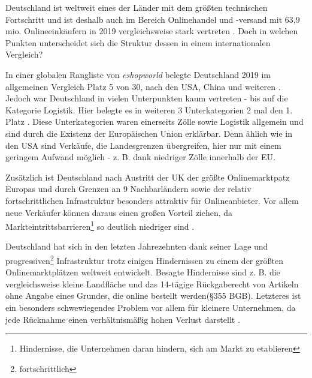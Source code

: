\iffalse

    https://www.worldretailcongress.com/__media/Global_ecommerce_Market_Ranking_2019_001.pdf
    
     \cite{esworld} 

    name: globaler vergleich bezüglich des onlinehandels

\fi

Deutschland ist weltweit eines der Länder mit dem größten technischen Fortschritt und ist deshalb auch im Bereich Onlinehandel und -versand mit 63,9 mio. Onlineeinkäufern in 2019 vergleichsweise stark vertreten \cite[S. 8]{esworld}. Doch in welchen Punkten unterscheidet sich die Struktur dessen in einem internationalen Vergleich?

In einer globalen Rangliste von \emph{eshopworld} belegte Deutschland 2019 im allgemeinen Vergleich Platz 5 von 30, nach den USA, China und weiteren \cite[S. 3]{esworld}. Jedoch war Deutschland in vielen Unterpunkten kaum vertreten - bis auf die Kategorie Logistik. Hier belegte es in weiteren 3 Unterkategorien 2 mal den 1. Platz \cite[S. 10ff]{esworld}. Diese Unterkategorien waren einerseits Zölle sowie Logistik allgemein und sind durch die Existenz der Europäischen Union erklärbar. Denn ählich wie in den USA \cite[S. 4]{esworld} sind Verkäufe, die Landesgrenzen übergreifen, hier nur mit einem geringem Aufwand möglich - z. B. dank niedriger Zölle innerhalb der EU.%

Zusätzlich ist Deutschland nach Austritt der UK der größte Onlinemarktpatz Europas und durch Grenzen an 9 Nachbarländern sowie der relativ fortschrittlichen Infrastruktur besonders attraktiv für Onlineanbieter. Vor allem neue Verkäufer können daraus einen großen Vorteil ziehen, da Markteintrittsbarrieren\footnote{Hindernisse, die Unternehmen daran hindern, sich am Markt zu etablieren} so deutlich niedriger sind \cite[S. 8]{esworld}.

Deutschland hat sich in den letzten Jahrezehnten dank seiner Lage und progressiven\footnote{fortschrittlich} Infrastruktur trotz einigen Hindernissen zu einem der größten Onlinemarktplätzen weltweit entwickelt. Besagte Hindernisse sind z. B. die vergleichsweise kleine Landfläche und das 14-tägige Rückgaberecht von Artikeln ohne Angabe eines Grundes, die online bestellt werden(§355 BGB). Letzteres ist ein besonders schwewiegendes Problem vor allem für kleinere Unternehmen, da jede Rücknahme einen verhältnismäßig hohen Verlust darstellt \cite{retourwahnsinn}.
